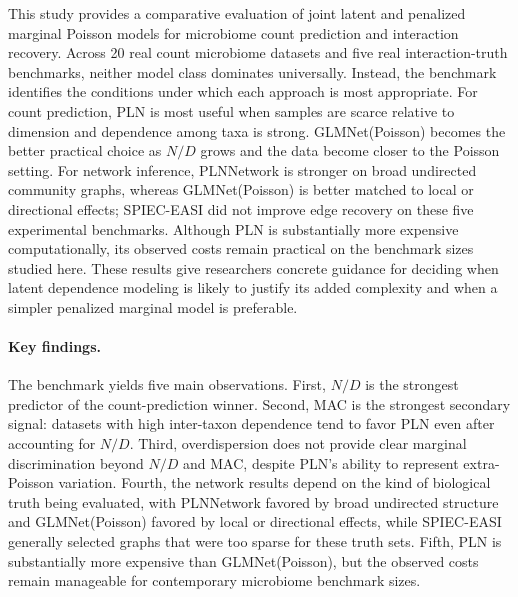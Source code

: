 \documentclass[USenglish]{article}
\theoremstyle{dgthm}
\begin{document}
This study provides a comparative evaluation of joint latent and penalized marginal Poisson models for microbiome count prediction and interaction recovery.
Across 20 real count microbiome datasets and five real interaction-truth benchmarks, neither model class dominates universally.
Instead, the benchmark identifies the conditions under which each approach is most appropriate.
For count prediction, PLN is most useful when samples are scarce relative to dimension and dependence among taxa is strong.
GLMNet(Poisson) becomes the better practical choice as $N/D$ grows and the data become closer to the Poisson setting.
For network inference, PLNNetwork is stronger on broad undirected community graphs, whereas GLMNet(Poisson) is better matched to local or directional effects; SPIEC-EASI did not improve edge recovery on these five experimental benchmarks.
Although PLN is substantially more expensive computationally, its observed costs remain practical on the benchmark sizes studied here.
These results give researchers concrete guidance for deciding when latent dependence modeling is likely to justify its added complexity and when a simpler penalized marginal model is preferable.

\paragraph{Key findings.}
The benchmark yields five main observations.
First, $N/D$ is the strongest predictor of the count-prediction winner.
Second, MAC is the strongest secondary signal: datasets with high inter-taxon dependence tend to favor PLN even after accounting for $N/D$.
Third, overdispersion does not provide clear marginal discrimination beyond $N/D$ and MAC, despite PLN's ability to represent extra-Poisson variation.
Fourth, the network results depend on the kind of biological truth being evaluated, with PLNNetwork favored by broad undirected structure and GLMNet(Poisson) favored by local or directional effects, while SPIEC-EASI generally selected graphs that were too sparse for these truth sets.
Fifth, PLN is substantially more expensive than GLMNet(Poisson), but the observed costs remain manageable for contemporary microbiome benchmark sizes.
\end{document}
